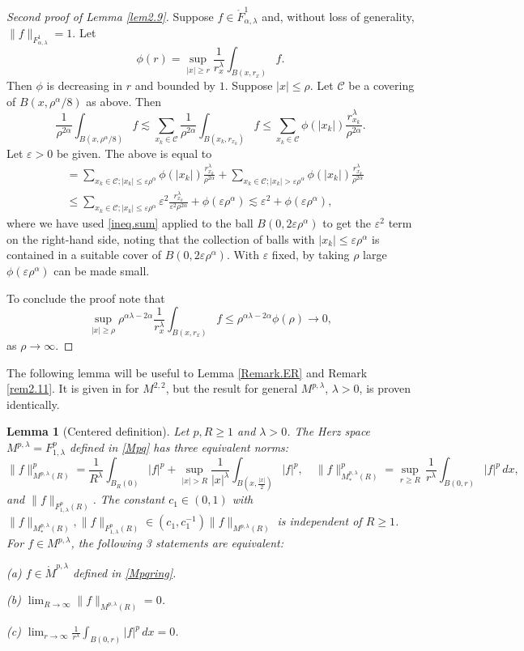 \documentclass[11pt]{article}
\numberwithin{equation}{section}
\newtheorem{lem}[thm]{Lemma}
\theoremstyle{remark}
\theoremstyle{definition}
\newcommand\al{\alpha}
\newcommand\e {\varepsilon}  %
\newcommand\la{\lambda}
\newcommand{\I}{\infty}
\newcommand{\EQ}[1]{\begin{equation} #1 \end{equation}}
\newcommand{\EQN}[1]{\begin{equation*}\begin{split} #1 \end{split}\end{equation*}}
\begin{document}
\begin{proof}[Second proof of Lemma \ref{lem2.9}]
Suppose $f\in \mathring F^1_{\al,\la}$ and, without loss of generality,
$\|f\|_{F^{1}_{\al,\la}}=1$.
 Let
\[
\phi(r) = \sup_{|x|\geq r} \frac 1 {r_{x}^\la} \int_{B(x,r_x)} f.
\]
Then $\phi$ is decreasing in $r$ and bounded by $1$. Suppose $|x|\leq \rho$. 
Let $\mathcal C$ be a covering of $B(x,\rho^\al/8)$ as above.
Then%
\EQ{
\frac 1 {\rho^{2\al}} \int_{B(x,\rho^\al/8)} f 
%
\lesssim \sum_{x_k\in \mathcal C} \frac 1 {\rho^{2\al}}\int_{B(x_k,r_{x_k})} f
\le \sum_{x_k\in \mathcal C} \phi(|x_k|)\frac {r_{x_k}^\la} {\rho^{2\al}} .
}
 Let $\e>0$ be given.  The above is equal to %
\EQN{
%
&=  \sum_{x_k\in \mathcal C;|x_k|\leq \e\rho^{\al}} \phi(|x_k|)\frac {r_{x_k}^\la} {\rho^{2\al}} + \sum_{x_k\in \mathcal C;|x_k|> \e\rho^{\al}} \phi(|x_k|) \frac {r_{x_k}^\la} {\rho^{2\al}}
\\&\leq    \sum_{x_k\in \mathcal C;|x_k|\leq \e\rho^{\al}}  \e^2  \frac {r_{x_k}^\la} {\e^2 \rho^{2\al }}   + \phi(\e\rho^\al)
\lesssim \e^2 	+\phi(\e\rho^\al),
}
where we have used \eqref{ineq.sum} applied to the ball $B(0,2\e \rho^\al)$ to get the $\e^2$ term on the right-hand side, noting that the collection of balls with $|x_k|\leq \e\rho^\al$ is contained in a suitable cover of $B(0,2\e \rho^\al)$. With $\e$ fixed, by taking $\rho$ large $\phi(\e\rho^\al)$ can be made small.

To conclude the proof note that
\[
\sup_{|x|\geq \rho}  \rho^{\al\la -2\al} \frac 1 {r_x^\la}\int_{B(x,r_x)}f\leq  \rho^{\al\la-2\al} \phi( \rho)  \to 0,
\]
as $\rho\to \I$.
\end{proof}
 
 
{The following lemma will be useful to Lemma \ref{Remark.ER} and Remark \ref{rem2.11}. It is
given in \cite[Lemma 2.1]{BKT} for $M^{2,2}$, but the result for general $M^{p,\la}$, $\la>0$, is proven identically.} 
 
\begin{lem}[Centered definition]\label{Mpq-centered} 
Let $p ,R\ge 1$ and $\la >0$.
The Herz space $M^{p,\la}=F^p_{1,\la}$ defined in \eqref{Mpq} has three equivalent norms: 
\[
\|f\|_{M^{p,\la}(R)}^p =\frac1{R^\la}\!\int_{B_R(0)}|f|^p +
\sup_{|x|>R}  \frac1{|x|^\la}\!\int_{B(x,  \frac{|x|}2)}|f|^p,
\quad
\|f\|_{ M_*^{p,\la}(R)}^p = \sup_{r\ge R}\, \frac 1 {r^\la}\! \int_{B(0,r)}|f|^p\,dx,
\]
and
$\|f\|_{F^{p}_{1,\la}(R)}$.
The constant $c_1\in (0,1)$ with 
$\|f\|_{M_*^{p,\la}(R)}, \|f\|_{F^{p}_{1,\la}(R)}  \in (c_1, c_1^{-1}) \|f\|_{M^{p,\la}(R)}$ 
is independent of $R \ge 1$.
For $f\in M^{p,\la}$, the following 3 statements are equivalent:\smallskip

\textup{(a)} $f\in \mathring M^{p,\la}$ defined in \eqref{Mpqring}.

\textup{(b)} $\lim_{R\to \infty} \|f\|_{M^{p,\la}(R)}=0$.

\textup{(c)} $\lim_{r\to \infty} \frac 1 {r^\la}\!\int_{B(0,r)}|f|^p\,dx=0$.

\end{lem}
\end{document}
